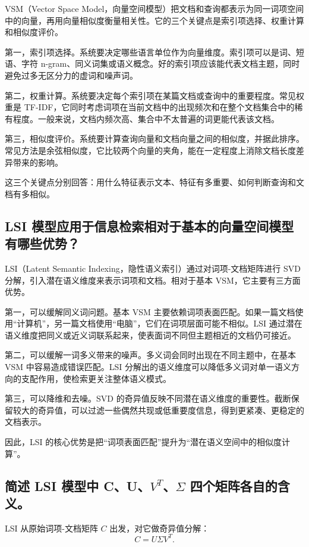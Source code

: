 VSM（Vector Space Model，向量空间模型）把文档和查询都表示为同一词项空间中的向量，再用向量相似度衡量相关性。它的三个关键点是索引项选择、权重计算和相似度评价。

第一，索引项选择。系统要决定哪些语言单位作为向量维度。索引项可以是词、短语、字符 n-gram、同义词集或语义概念。好的索引项应该能代表文档主题，同时避免过多无区分力的虚词和噪声词。

第二，权重计算。系统要决定每个索引项在某篇文档或查询中的重要程度。常见权重是 TF-IDF，它同时考虑词项在当前文档中的出现频次和在整个文档集合中的稀有程度。一般来说，文档内频次高、集合中不太普遍的词更能代表该文档。

第三，相似度评价。系统要计算查询向量和文档向量之间的相似度，并据此排序。常见方法是余弦相似度，它比较两个向量的夹角，能在一定程度上消除文档长度差异带来的影响。

这三个关键点分别回答：用什么特征表示文本、特征有多重要、如何判断查询和文档有多相似。

\subsection{LSI 模型应用于信息检索相对于基本的向量空间模型有哪些优势？}

LSI（Latent Semantic Indexing，隐性语义索引）通过对词项-文档矩阵进行 SVD 分解，引入潜在语义维度来表示词项和文档。相对于基本 VSM，它主要有三方面优势。

第一，可以缓解同义词问题。基本 VSM 主要依赖词项表面匹配。如果一篇文档使用“计算机”，另一篇文档使用“电脑”，它们在词项层面可能不相似。LSI 通过潜在语义维度把同义或近义词联系起来，使表面词不同但主题相近的文档仍可接近。

第二，可以缓解一词多义带来的噪声。多义词会同时出现在不同主题中，在基本 VSM 中容易造成错误匹配。LSI 分解出的语义维度可以降低多义词对单一语义方向的支配作用，使检索更关注整体语义模式。

第三，可以降维和去噪。SVD 的奇异值反映不同潜在语义维度的重要性。截断保留较大的奇异值，可以过滤一些偶然共现或低重要度信息，得到更紧凑、更稳定的文档表示。

因此，LSI 的核心优势是把“词项表面匹配”提升为“潜在语义空间中的相似度计算”。

\subsection{简述 LSI 模型中 C、U、$V^T$、$\Sigma$ 四个矩阵各自的含义。}

LSI 从原始词项-文档矩阵 $C$ 出发，对它做奇异值分解：
\[
  C = U\Sigma V^T.
\]

